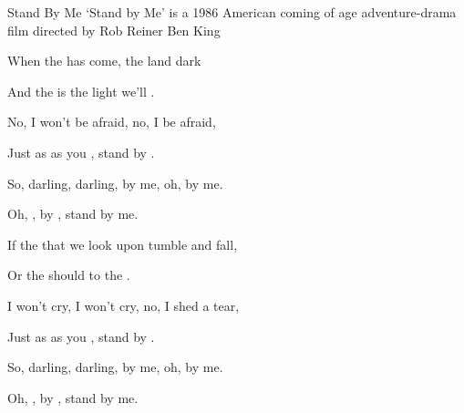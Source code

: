 \begin{SBSong}{Stand By Me}
  {`Stand by Me' is a 1986 American coming of age adventure-drama film directed by Rob Reiner}
  {Ben King}
  \begin{SBVerse}
    When the  has come,  the land dark 
    
    And the  is the  light we'll . 
    
    No, I won't be afraid, no, I  be afraid, 
    
    Just as  as you , stand by . 
  \end{SBVerse}
  \begin{SBChorus}
    So, darling, darling,  by me, oh,  by me. 
    
    Oh, ,  by , stand by me. 
  \end{SBChorus}
  \begin{SBVerse}
    If the  that we look upon  tumble and fall, 
    
    Or the  should  to the . 
    
    I won't cry, I won't cry, no, I  shed a tear, 
    
    Just as  as you , stand by . 
  \end{SBVerse}
  \begin{SBChorus}
    So, darling, darling,  by me, oh,  by me. 
    
    Oh, ,  by , stand by me. 
  \end{SBChorus}
  
\end{SBSong}
